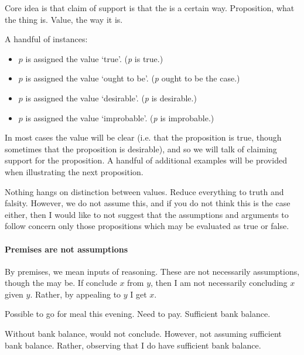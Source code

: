 \begin{note}
  Core idea is that claim of support is that the \world{} is a certain way.
  Proposition, what the thing is.
  Value, the way it is.

  A handful of instances:
  \begin{itemize}
  \item \(p\) is assigned the value `true'. \hfill (\emph{p} is true.)
  \item \(p\) is assigned the value `ought to be'. \hfill (\emph{p} ought to be the case.)
  \item \(p\) is assigned the value `desirable'. \hfill (\emph{p} is desirable.)
  \item \(p\) is assigned the value `improbable'. \hfill (\emph{p} is improbable.)
  \end{itemize}
\end{note}

\begin{note}
In most cases the value will be clear (i.e. that the proposition is true, though sometimes that the proposition is desirable), and so we will talk of claiming support for the proposition.
  A handful of additional examples will be provided when illustrating the next proposition.
\end{note}

\begin{note}
  Nothing hangs on distinction between values.
  Reduce everything to truth and falsity.
  However, we do not assume this, and if you do not think this is the case either, then I would like to not suggest that the assumptions and arguments to follow concern only those propositions which may be evaluated as true or false.
\end{note}

\paragraph*{Premises are not assumptions}

\begin{note}
  By premises, we mean inputs of reasoning.
  These are not necessarily assumptions, though the may be.
  If conclude \(x\) from \(y\), then I am not necessarily concluding \(x\) given \(y\).
  Rather, by appealing to \(y\) I get \(x\).

  Possible to go for meal this evening.
  Need to pay.
  Sufficient bank balance.

  Without bank balance, would not conclude.
  However, not assuming sufficient bank balance.
  Rather, observing that I do have sufficient bank balance.
\end{note}

